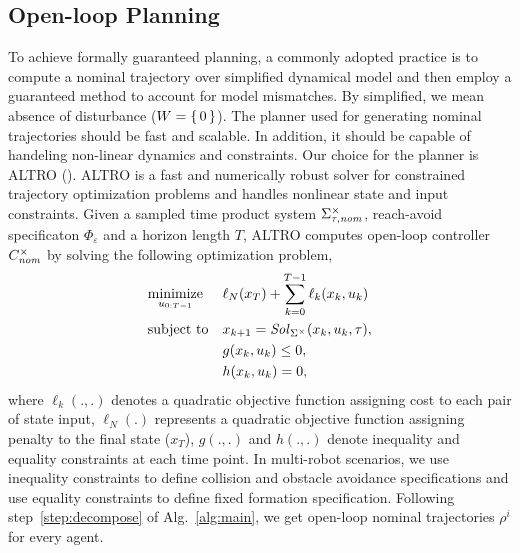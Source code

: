

\subsection{Open-loop Planning}
To achieve formally guaranteed planning, a commonly adopted practice is to compute a nominal trajectory over simplified dynamical model and then employ a guaranteed method to account for model mismatches. By simplified, we mean absence of disturbance ($W=\set{0}$). The planner used for generating nominal trajectories should be fast and scalable. In addition, it should be capable of handeling non-linear dynamics and constraints. Our choice for the planner is ALTRO (\cite{howell2019altro}). ALTRO is a fast and numerically robust solver for constrained trajectory optimization problems and handles nonlinear state and input constraints. Given a sampled time product system $\Sigma_{\tau,\mathit{nom}}^\times$, reach-avoid specificaton $\Phi_\varepsilon$ and a horizon length $T$, ALTRO computes open-loop controller $C^\times_{\mathit{nom}}$ by solving the following optimization problem,
\begin{equation*}
	\begin{aligned}
		& \underset{u_{0:T-1}}{\text{minimize}}
		& & \ell_N(x_T)+\sum_{k=0}^{T-1}\ell_k(x_k,u_k) \\
		& \text{subject to}
		& & x_{k+1}=\mathit{Sol}_{\Sigma^\times}(x_k,u_k,\tau),\\
		& & &  g(x_k,u_k)\leq 0,\\
		& & &  h(x_k,u_k)=0,
	\end{aligned}
\end{equation*}
where $\ell_k(.,.)$ denotes a quadratic objective function assigning cost to each pair of state input, $\ell_N(.)$ represents a quadratic objective function assigning penalty to the final state ($x_T$), $g(.,.)$ and $h(.,.)$ denote inequality and equality constraints at each time point.
In multi-robot scenarios, we use inequality constraints to define collision and obstacle avoidance specifications and use equality constraints to define fixed formation specification. Following step~\ref{step:decompose} of Alg.~\ref{alg:main}, we get open-loop nominal trajectories $\rho^i$ for every agent.


